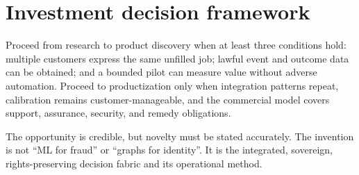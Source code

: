 \section{Investment decision framework}

Proceed from research to product discovery when at least three conditions hold: multiple customers express the same unfilled job; lawful event and outcome data can be obtained; and a bounded pilot can measure value without adverse automation. Proceed to productization only when integration patterns repeat, calibration remains customer-manageable, and the commercial model covers support, assurance, security, and remedy obligations.

The opportunity is credible, but novelty must be stated accurately. The invention is not ``ML for fraud'' or ``graphs for identity''. It is the integrated, sovereign, rights-preserving decision fabric and its operational method.

